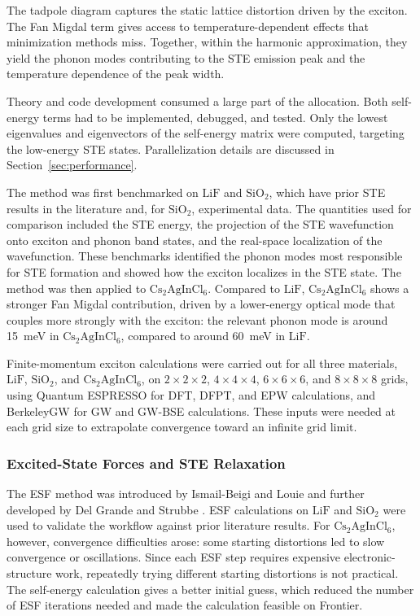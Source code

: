 \documentclass[11pt]{article}
\begin{document}
The tadpole diagram captures the static lattice distortion driven by the
exciton. The Fan Migdal term gives access to temperature-dependent effects that
minimization methods miss. Together, within the harmonic approximation, they
yield the phonon modes contributing to the STE emission peak and the
temperature dependence of the peak width.

Theory and code development consumed a large part of the allocation. Both
self-energy terms had to be implemented, debugged, and tested. Only the lowest
eigenvalues and eigenvectors of the self-energy matrix were computed, targeting
the low-energy STE states. Parallelization details are discussed in
Section~\ref{sec:performance}.

The method was first benchmarked on \(\mathrm{LiF}\) and \(\mathrm{SiO_2}\),
which have prior STE results in the literature and, for \(\mathrm{SiO_2}\),
experimental data. The quantities used for comparison included the STE energy,
the projection of the STE wavefunction onto exciton and phonon band states, and
the real-space localization of the wavefunction. These benchmarks identified the
phonon modes most responsible for STE formation and showed how the exciton
localizes in the STE state. The method was then applied to
\(\mathrm{Cs_2AgInCl_6}\). Compared to \(\mathrm{LiF}\),
\(\mathrm{Cs_2AgInCl_6}\) shows a stronger Fan Migdal contribution, driven by a
lower-energy optical mode that couples more strongly with the exciton: the
relevant phonon mode is around 15~meV in \(\mathrm{Cs_2AgInCl_6}\), compared to
around 60~meV in \(\mathrm{LiF}\).

Finite-momentum exciton calculations were carried out for all three materials, 
\(\mathrm{LiF}\), \(\mathrm{SiO_2}\), and \(\mathrm{Cs_2AgInCl_6}\), on \(2 \times 2 \times 2\), \(4 \times 4 \times 4\),
\(6 \times 6 \times 6\), and \(8 \times 8 \times 8\) grids, using Quantum
ESPRESSO for DFT, DFPT, and EPW calculations, and BerkeleyGW for GW and
GW-BSE calculations. These inputs were needed at each grid size
to extrapolate convergence toward an infinite grid limit. 

\subsubsection{Excited-State Forces and STE Relaxation}

The ESF method was introduced by Ismail-Beigi and Louie \cite{ismailbeigi2003esf}
and further developed by Del Grande and Strubbe \cite{delgrande2025esf}. ESF
calculations on \(\mathrm{LiF}\) and \(\mathrm{SiO_2}\) were used to validate
the workflow against prior literature results. For \(\mathrm{Cs_2AgInCl_6}\),
however, convergence difficulties
arose: some starting distortions led to slow convergence or oscillations. Since
each ESF step requires expensive electronic-structure work, repeatedly trying
different starting distortions is not practical. The self-energy calculation
gives a better initial guess, which reduced the number of ESF iterations needed
and made the calculation feasible on Frontier.
\end{document}
